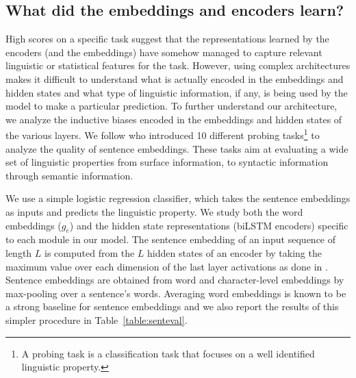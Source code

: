 \documentclass[letterpaper]{article}
\begin{document}
\begin{table}
\centering
\caption{Ablation study on the embeddings. We remove one by one the embeddings on the first layer of the best performing model (A-RS-GM).}
\label{table:ablation_embeddings}
\end{table}



\subsection{What did the embeddings and encoders learn?}

High scores on a specific task suggest that the representations learned by the encoders (and the embeddings) have somehow managed to capture relevant linguistic or statistical features for the task. However, using complex architectures makes it difficult to understand what is actually encoded in the embeddings and hidden states and what type of linguistic information, if any, is being used by the model to make a particular prediction. To further understand our architecture, we analyze the inductive biases encoded in the embeddings and hidden states of the various layers. We follow \citeauthor{Conneau2018}  who introduced 10 different probing tasks\footnote{A probing task is a classification task that focuses on a well identified linguistic property.} to analyze the quality of sentence embeddings. These tasks aim at evaluating a wide set of linguistic properties from surface information, to syntactic information through semantic information.

We use a simple logistic regression classifier, which takes the sentence embeddings as inputs and predicts the linguistic property. We study both the word embeddings ($g_{e}$) and the hidden state representations (biLSTM encoders) specific to each module in our model. The sentence embedding of an input sequence of length $L$ is computed from the $L$ hidden states of an encoder by taking the maximum value over each dimension of the last layer activations as done in \cite{Conneau17}.
Sentence embeddings are obtained from word and character-level embeddings by max-pooling over a sentence's words. Averaging word embeddings is known to be a strong baseline for sentence embeddings \cite{Arora2017asimple} and we also report the results of this simpler procedure in Table~\ref{table:senteval}.
\end{document}
